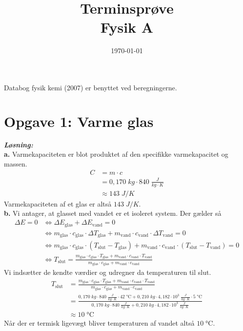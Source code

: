 \documentclass{report}
\title{Terminsprøve\\
{\Large \textbf{Fysik A}}}
\date{\today}
\newcommand{\sol}{\setlength{\parindent}{0cm}\textbf{\textit{Løsning:}}\setlength{\parindent}{1cm}}
\begin{document}
\maketitle
\begin{note}
  Databog fysik kemi (2007) er benyttet ved beregningerne.
\end{note}
\section*{Opgave 1: Varme glas}
\sol \\
\textbf{a.}
Varmekapaciteten er blot produktet af den specifikke varmekapacitet og massen.
\begin{equation*}
\begin{split}
  C&=m \cdot c \\
  &=0,170 \;\unit{kg} \cdot 840 \;\unit{\frac{J}{kg \cdot K}} \\
  &\approx 143 \;\unit{J/K} 
\end{split}
\end{equation*}
Varmekapaciteten af et glas er altså $143 \;\unit{J/K} $.\\[1ex]
\textbf{b.}
Vi antager, at glasset med vandet er et isoleret system.
Der gælder så
\begin{equation*}
\begin{split}
  \Delta E=0 &\iff \Delta E_{\text{glas} } + \Delta E _{\text{vand} }=0\\
  &\iff m_{\text{glas} } \cdot c_{\text{glas} } \cdot \Delta T_{\text{glas} } + m_{\text{vand} } \cdot c_{\text{vand} } \cdot \Delta T_{\text{vand} }=0\\
  &\iff m_{\text{glas} } \cdot c_{\text{glas} } \cdot \left(T _{\text{slut} }-T _{\text{glas} }\right) + m_{\text{vand} } \cdot c_{\text{vand} } \cdot \left(T _{\text{slut} }-T _{\text{vand} }\right)=0\\
  &\iff T _{\text{slut} }=\frac{m_{\text{glas} } \cdot c_{\text{glas} } \cdot T _{\text{glas} }+m_{\text{vand} } \cdot c_{\text{vand} } \cdot T _{\text{vand} }}{m_{\text{glas} } \cdot c_{\text{glas} } + m_{\text{vand} } \cdot c_{\text{vand} }}
\end{split}
\end{equation*}
Vi indsætter de kendte værdier og udregner da temperaturen til slut.
\begin{equation*}
\begin{split}
  T _{\text{slut} }&=\frac{m_{\text{glas} } \cdot c_{\text{glas} } \cdot T _{\text{glas} }+m_{\text{vand} } \cdot c_{\text{vand} } \cdot T _{\text{vand} }}{m_{\text{glas} } \cdot c_{\text{glas} } + m_{\text{vand} } \cdot c_{\text{vand} }}\\
  &=\frac{0,170 \;\unit{kg} \cdot 840 \;\unit{\frac{J}{kg \cdot K}} \cdot 42 \;\unit{\celsius} + 0,210 \;\unit{kg} \cdot 4,182 \cdot 10^3\;\unit{\frac{J}{kg \cdot K}} \cdot 5 \;\unit{\celsius} }{0,170 \;\unit{kg} \cdot 840 \;\unit{\frac{J}{kg \cdot K}} + 0,210 \;\unit{kg} \cdot 4,182 \cdot 10^3\;\unit{\frac{J}{kg \cdot K}}}\\
  &\approx 10 \;\unit{\celsius} 
\end{split}
\end{equation*}
Når der er termisk ligevægt bliver temperaturen af vandet altså $10 \;\unit{\celsius} $.
\end{document}
